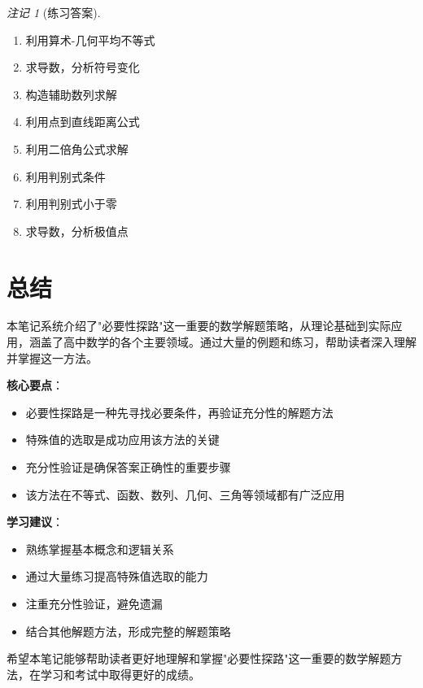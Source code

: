 \documentclass[a4paper,11pt]{ctexart}
\newcommand{\method}[1]{\textcolor{accent}{\textbf{#1}}}
\newcommand{\keypoint}[1]{\textcolor{secondary}{\textbf{#1}}}
\theoremstyle{definition}
\theoremstyle{remark}
\newtheorem{remark}{注记}[section]
\begin{document}
\begin{remark}[练习答案]
\begin{enumerate}
    \item 利用算术-几何平均不等式
    \item 求导数，分析符号变化
    \item 构造辅助数列求解
    \item 利用点到直线距离公式
    \item 利用二倍角公式求解
    \item 利用判别式条件
    \item 利用判别式小于零
    \item 求导数，分析极值点
\end{enumerate}
\end{remark}

\newpage

\section*{总结}

本笔记系统介绍了"必要性探路"这一重要的数学解题策略，从理论基础到实际应用，涵盖了高中数学的各个主要领域。通过大量的例题和练习，帮助读者深入理解并掌握这一方法。

\keypoint{核心要点}：
\begin{itemize}
    \item 必要性探路是一种先寻找必要条件，再验证充分性的解题方法
    \item 特殊值的选取是成功应用该方法的关键
    \item 充分性验证是确保答案正确性的重要步骤
    \item 该方法在不等式、函数、数列、几何、三角等领域都有广泛应用
\end{itemize}

\method{学习建议}：
\begin{itemize}
    \item 熟练掌握基本概念和逻辑关系
    \item 通过大量练习提高特殊值选取的能力
    \item 注重充分性验证，避免遗漏
    \item 结合其他解题方法，形成完整的解题策略
\end{itemize}

希望本笔记能够帮助读者更好地理解和掌握"必要性探路"这一重要的数学解题方法，在学习和考试中取得更好的成绩。
\end{document}
